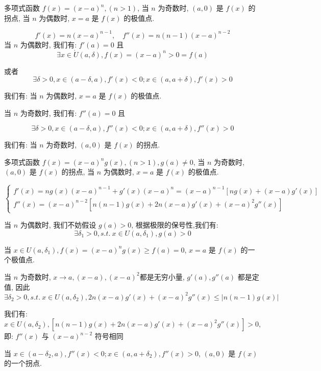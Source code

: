 \begin{proposition}\label{pro: 命题一}
	多项式函数 $f(x) = (x-a)^{n},(n>1)$, 当 $n$ 为奇数时, $(a,0)$ 是 $f(x)$ 的拐点, 当 $n$ 为偶数时, $x=a$ 是 $f(x)$ 的极值点.
\end{proposition}
\begin{anymark}[证明]

	$$f'(x) = n(x-a)^{n-1},\quad f''(x) = n(n-1)(x-a)^{n-2}$$
	当 $n$ 为偶数时, 我们有: $f'(a) = 0$ 且 
	$$\exists x\in \mathring{U}(a,\delta), f(x) = (x-a)^{n} > 0 = f(a)$$

	或者 
	$$\exists \delta > 0, x\in (a-\delta,a),f'(x)<0; x\in (a,a+\delta),f'(x)>0$$
	
	我们有: 当 $n$ 为偶数时, $x=a$ 是 $f(x)$ 的极值点.
	
	当 $n$ 为奇数时, 我们有: $f''(a) = 0$ 且
	
	$$\exists \delta > 0, x\in (a-\delta,a),f''(x)<0; x\in (a,a+\delta),f''(x)>0$$

	我们有: 当 $n$ 为奇数时, $(a,0)$ 是 $f(x)$ 的拐点.
	

\end{anymark}


\begin{proposition}\label{pro: 命题二}
	多项式函数 $f(x) = (x-a)^{n}g(x), (n>1), g(a)\neq 0$, 当 $n$ 为奇数时, $(a,0)$ 是 $f(x)$ 的拐点, 当 $n$ 为偶数时, $x=a$ 是 $f(x)$ 的极值点.
\end{proposition}
\begin{anymark}[证明]

	$$\begin{cases}
		f'(x) = ng(x)(x-a)^{n-1} + g'(x)(x-a)^{n} = (x-a)^{n-1}[ng(x)+(x-a)g'(x)]\\
		f''(x) = (x-a)^{n-2}[n(n-1)g(x) +2n(x-a)g'(x)+(x-a)^{2}g''(x)]
	\end{cases}$$

	当 $n$ 为偶数时, 我们不妨假设 $g(a) > 0$, 根据极限的保号性,我们有:
	$$\exists \delta_{1} > 0, s.t.\ x\in U(a,\delta_{1}), g(a) > 0$$
	
	当 $x\in U(a,\delta_{1}), f(x) = (x-a)^{n}g(x) \geq f(a) =0$, $x=a$ 是 $f(x)$ 的一个极值点. 


	当 $n$ 为奇数时, $x\to a,(x-a),(x-a)^{2}$都是无穷小量, $g'(a),g''(a)$ 都是定值, 因此
	$$\exists \delta_{2} > 0, s.t.\ x\in U(a,\delta_{2}), 2n(x-a)g'(x)+(x-a)^{2}g''(x)\leq |n(n-1)g(x)| $$

	我们有: $x\in U(a,\delta_{2}), [n(n-1)g(x) +2n(x-a)g'(x)+(x-a)^{2}g''(x)] > 0$, 即: $f''(x)$ 与 $(x-a)^{n-2}$ 符号相同

	当 $x\in (a-\delta_{2},a), f''(x) < 0; x\in (a,a+\delta_{2}), f''(x) > 0$, $(a,0)$ 是 $f(x)$ 的一个拐点.
\end{anymark}

